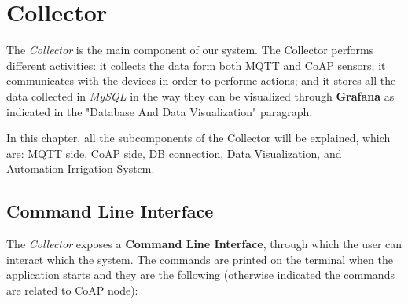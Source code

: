 \section{Collector}
The \textit{Collector} is the main component of our system. The Collector performs different activities: it collects the data form both MQTT and CoAP sensors; it communicates with the devices in order to performe actions; and it stores all the data collected in \textit{MySQL} in the way they can be visualized through \textbf{Grafana} as indicated in the "Database And Data Visualization" paragraph.

In this chapter, all the subcomponents of the Collector will be explained, which are:  MQTT side, CoAP side, DB connection, Data Visualization, and Automation Irrigation System.

\subsection{Command Line Interface}
The \textit{Collector} exposes a \textbf{Command Line Interface}, through which the user can interact which the system. The commands are printed on the terminal when the application starts and they are the following (otherwise indicated the commands are related to CoAP node):

